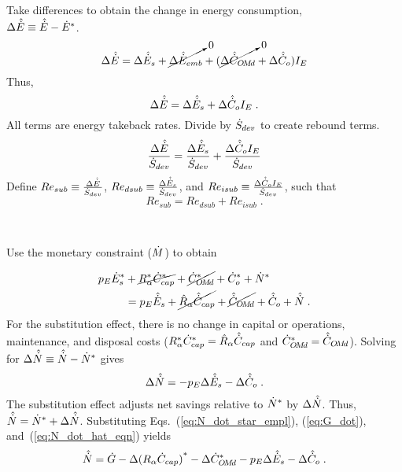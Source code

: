 \begin{landscape}
{Take differences to obtain the change in energy consumption, \\
$\Delta \hat{\dot{E}} \equiv \hat{\dot{E}} - {\dot{E}}^*$.
%
\begin{equation}
  \Delta \hat{\dot{E}} = \Delta \hat{\dot{E}}_s 
                      + \cancelto{0}{\Delta \hat{\dot{E}}_{emb}} 
                      + (\cancelto{0}{\Delta \hat{\dot{C}}_{O\!M\!d}} + \Delta \hat{\dot{C}}_o) I_E
\end{equation}
%
Thus, 
%
\begin{equation}
  \Delta \hat{\dot{E}} = \Delta \hat{\dot{E}}_s + \Delta \hat{\dot{C}}_o I_E \; .
\end{equation}
%
All terms are energy takeback rates.
Divide by $\dot{S}_{dev}$
to create rebound terms.
%
\begin{equation}
    \frac{\Delta \hat{\dot{E}}}{\dot{S}_{dev}} = \frac{\Delta \hat{\dot{E}}_s}{\dot{S}_{dev}} + \frac{\Delta \hat{\dot{C}}_o I_E}{\dot{S}_{dev}}
\end{equation}
%
Define 
$Re_{sub} \equiv \frac{\Delta \hat{\dot{E}}}{\dot{S}_{dev}}$, 
$Re_{dsub} \equiv \frac{\Delta \hat{\dot{E}}_s}{\dot{S}_{dev}}$, and
$Re_{isub} \equiv \frac{\Delta \hat{\dot{C}}_o I_E}{\dot{S}_{dev}}$,
such that
%
\begin{equation} \label{eq:Re_sub_def}
  Re_{sub} = Re_{dsub} + Re_{isub} \; .
\end{equation}

}
{
~
  
Use the monetary constraint ($\dot{M}$) to obtain

\begin{align}
  p_E {\dot{E}}^*_s &+ \cancel{{R}^*_\alpha {\dot{C}}^*_{cap}} + \cancel{{\dot{C}}^*_{O\!M\!d}} + {\dot{C}}^*_o + {\dot{N}}^* \nonumber \\
                   &= p_E \hat{\dot{E}}_s + \cancel{\hat{R}_\alpha \hat{\dot{C}}_{cap}} + \cancel{\hat{\dot{C}}_{O\!M\!d}} + \hat{\dot{C}}_o + \hat{\dot{N}} \; .
\end{align}
%
For the substitution effect, there is no change in capital or operations, maintenance, and disposal costs
(${R}^*_\alpha {\dot{C}}^*_{cap} = \hat{R}_\alpha \hat{\dot{C}}_{cap}$ and 
${\dot{C}}^*_{O\!M\!d} = \hat{\dot{C}}_{O\!M\!d}$).
Solving for $\Delta \hat{\dot{N}} \equiv \hat{\dot{N}} - {\dot{N}}^*$ gives
%
\begin{equation} \label{eq:N_dot_hat_eqn}
  \Delta \hat{\dot{N}} = - p_E \Delta \hat{\dot{E}}_s - \Delta \hat{\dot{C}}_o \; .
\end{equation}
%
The substitution effect adjusts net savings relative to ${\dot{N}}^*$
by $\Delta \hat{\dot{N}}$.
Thus, $\hat{\dot{N}} = {\dot{N}}^* + \Delta \hat{\dot{N}}$.
Substituting Eqs.~(\ref{eq:N_dot_star_empl}), (\ref{eq:G_dot}), and~(\ref{eq:N_dot_hat_eqn})
yields
%
\begin{equation} \label{eq:N_dot_after_sub}
  \hat{\dot{N}} = \dot{G} - \Delta {(R_\alpha \dot{C}_{cap})}^* - \Delta {\dot{C}}^*_{O\!M\!d} - p_E \Delta \hat{\dot{E}}_s - \Delta \hat{\dot{C}}_o \; .
\end{equation}
%
}

\end{landscape}
